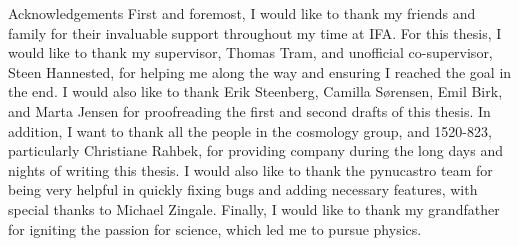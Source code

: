 


\begin{multiabstract}{Acknowledgements} 
\noindent First and foremost, I would like to thank my friends and family for their invaluable support throughout my time at IFA. For this thesis, I would like to thank my supervisor, Thomas Tram, and unofficial co-supervisor, Steen Hannested, for helping me along the way and ensuring I reached the goal in the end. I would also like to thank Erik Steenberg, Camilla Sørensen, Emil Birk, and Marta Jensen for proofreading the first and second drafts of this thesis. In addition, I want to thank all the people in the cosmology group, and 1520-823, particularly Christiane Rahbek, for providing company during the long days and nights of writing this thesis. I would also like to thank the pynucastro team for being very helpful in quickly fixing bugs and adding necessary features, with special thanks to Michael Zingale. 
Finally, I would like to thank my grandfather for igniting the passion for science, which led me to pursue physics.

\end{multiabstract}
